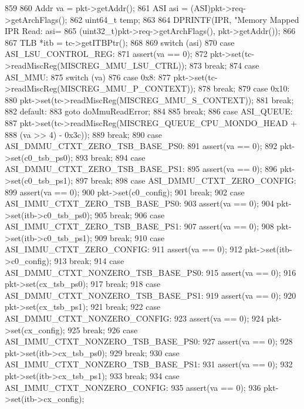 \begin{DoxyCode}
859 {
860     Addr va = pkt->getAddr();
861     ASI asi = (ASI)pkt->req->getArchFlags();
862     uint64_t temp;
863 
864     DPRINTF(IPR, "Memory Mapped IPR Read: asi=%
865          (uint32_t)pkt->req->getArchFlags(), pkt->getAddr());
866 
867     TLB *itb = tc->getITBPtr();
868 
869     switch (asi) {
870       case ASI_LSU_CONTROL_REG:
871         assert(va == 0);
872         pkt->set(tc->readMiscReg(MISCREG_MMU_LSU_CTRL));
873         break;
874       case ASI_MMU:
875         switch (va) {
876           case 0x8:
877             pkt->set(tc->readMiscReg(MISCREG_MMU_P_CONTEXT));
878             break;
879           case 0x10:
880             pkt->set(tc->readMiscReg(MISCREG_MMU_S_CONTEXT));
881             break;
882           default:
883             goto doMmuReadError;
884         }
885         break;
886       case ASI_QUEUE:
887         pkt->set(tc->readMiscReg(MISCREG_QUEUE_CPU_MONDO_HEAD +
888                     (va >> 4) - 0x3c));
889         break;
890       case ASI_DMMU_CTXT_ZERO_TSB_BASE_PS0:
891         assert(va == 0);
892         pkt->set(c0_tsb_ps0);
893         break;
894       case ASI_DMMU_CTXT_ZERO_TSB_BASE_PS1:
895         assert(va == 0);
896         pkt->set(c0_tsb_ps1);
897         break;
898       case ASI_DMMU_CTXT_ZERO_CONFIG:
899         assert(va == 0);
900         pkt->set(c0_config);
901         break;
902       case ASI_IMMU_CTXT_ZERO_TSB_BASE_PS0:
903         assert(va == 0);
904         pkt->set(itb->c0_tsb_ps0);
905         break;
906       case ASI_IMMU_CTXT_ZERO_TSB_BASE_PS1:
907         assert(va == 0);
908         pkt->set(itb->c0_tsb_ps1);
909         break;
910       case ASI_IMMU_CTXT_ZERO_CONFIG:
911         assert(va == 0);
912         pkt->set(itb->c0_config);
913         break;
914       case ASI_DMMU_CTXT_NONZERO_TSB_BASE_PS0:
915         assert(va == 0);
916         pkt->set(cx_tsb_ps0);
917         break;
918       case ASI_DMMU_CTXT_NONZERO_TSB_BASE_PS1:
919         assert(va == 0);
920         pkt->set(cx_tsb_ps1);
921         break;
922       case ASI_DMMU_CTXT_NONZERO_CONFIG:
923         assert(va == 0);
924         pkt->set(cx_config);
925         break;
926       case ASI_IMMU_CTXT_NONZERO_TSB_BASE_PS0:
927         assert(va == 0);
928         pkt->set(itb->cx_tsb_ps0);
929         break;
930       case ASI_IMMU_CTXT_NONZERO_TSB_BASE_PS1:
931         assert(va == 0);
932         pkt->set(itb->cx_tsb_ps1);
933         break;
934       case ASI_IMMU_CTXT_NONZERO_CONFIG:
935         assert(va == 0);
936         pkt->set(itb->cx_config);
}}
\end{DoxyCode}
